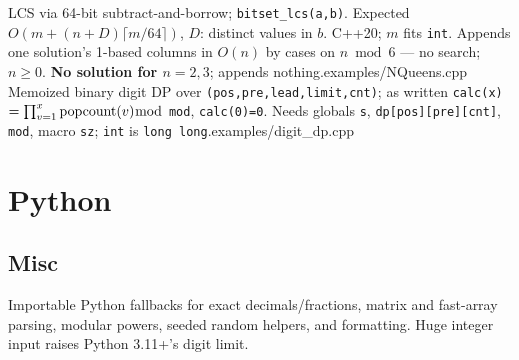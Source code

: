 %
{LCS via 64-bit subtract-and-borrow; \texttt{bitset\_lcs(a,b)}. Expected $O(m+(n+D)\lceil m/64\rceil)$, $D$: distinct values in $b$. C++20; $m$ fits \texttt{int}.}
%
{Appends one solution's 1-based columns in $O(n)$ by cases on $n\bmod 6$ --- no search; $n\ge0$. \textbf{No solution for $n=2,3$}; appends nothing.}{examples/NQueens.cpp}
%
{Memoized binary digit DP over \texttt{(pos,pre,lead,limit,cnt)}; as written \texttt{calc(x)} $=\prod_{v=1}^{x}\mathrm{popcount}(v)\bmod$ \texttt{mod}, \texttt{calc(0)=0}. Needs globals \texttt{s}, \texttt{dp[pos][pre][cnt]}, \texttt{mod}, macro \texttt{sz}; \texttt{int} is \texttt{long long}.}{examples/digit_dp.cpp}
\section{Python}
\subsection{Misc}
{\footnotesize Importable Python fallbacks for exact decimals/fractions, matrix and fast-array parsing, modular powers, seeded random helpers, and formatting. Huge integer input raises Python 3.11+'s digit limit.\par}\vspace{-0.6em}%

% 
